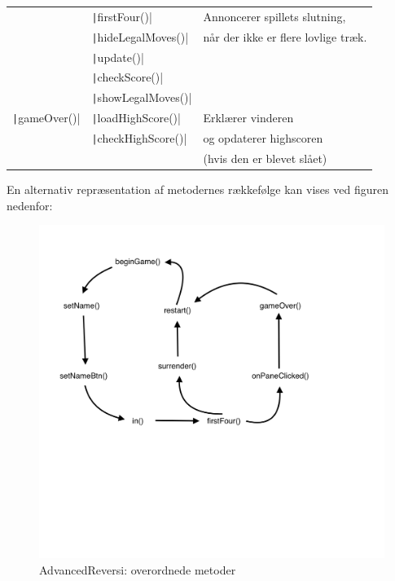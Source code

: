 \begin{table}[H]
\begin{tabular}{lll}
                                           & \texttt|firstFour()|      & Annoncerer spillets slutning,                 \\
                                           & \texttt|hideLegalMoves()| & når der ikke er flere lovlige træk.           \\
                                           & \texttt|update()|         &                                               \\
                                           & \texttt|checkScore()|     &                                               \\
                                           & \texttt|showLegalMoves()| &                                               \\
        \texttt|gameOver()|      & \texttt|loadHighScore()|  & Erklærer vinderen                             \\
                                           & \texttt|checkHighScore()| & og opdaterer highscoren                       \\
                                           &                                     & (hvis den er blevet slået)                    \\
        \bottomrule
    \end{tabular}
\end{table}
En alternativ repræsentation af metodernes rækkefølge kan vises ved figuren nedenfor:
\begin{figure}[H]
    \centering
    \caption{AdvancedReversi: overordnede metoder}\label{ARF}
    \includegraphics[width=1\textwidth]{Graphics/Screenshot 2023-01-20 at 16.35.36.png}
\end{figure}
